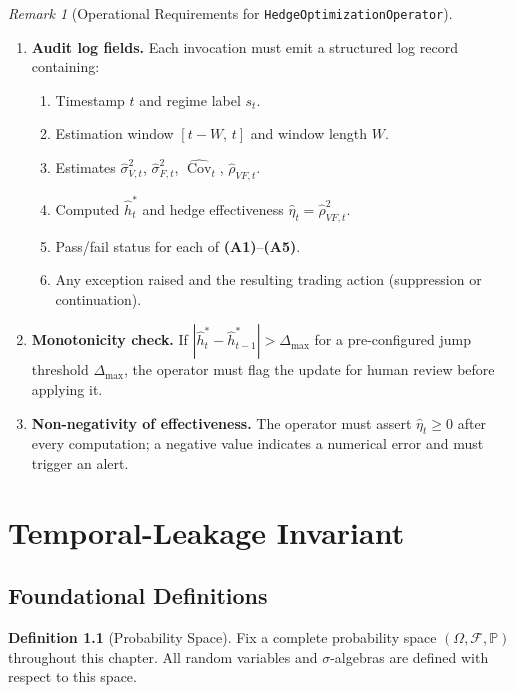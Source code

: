 \documentclass[12pt,openany]{book}
\numberwithin{equation}{chapter}
\theoremstyle{plain}
\theoremstyle{definition}
\newtheorem{definition}[theorem]{Definition}
\theoremstyle{remark}
\newtheorem{remark}[theorem]{Remark}
\numberwithin{equation}{chapter}
\theoremstyle{plain}
\DeclareMathOperator{\Cov}{Cov}
\begin{document}
\begin{remark}[Operational Requirements for \texttt{HedgeOptimizationOperator}]
\begin{enumerate}
  \item \textbf{Audit log fields.}
        Each invocation must emit a structured log record containing:
        \begin{enumerate}
          \item Timestamp $t$ and regime label $s_t$.
          \item Estimation window $[t-W,\,t]$ and window length $W$.
          \item Estimates $\hat\sigma_{V,t}^2$, $\hat\sigma_{F,t}^2$,
                $\widehat{\Cov}_t$, $\hat\rho_{VF,t}$.
          \item Computed $\hat{h}^*_t$ and hedge effectiveness
                $\hat\eta_t = \hat\rho_{VF,t}^2$.
          \item Pass/fail status for each of
                \textbf{(A1)}--\textbf{(A5)}.
          \item Any exception raised and the resulting trading action
                (suppression or continuation).
        \end{enumerate}

  \item \textbf{Monotonicity check.}
        If $|\hat{h}^*_t - \hat{h}^*_{t-1}| > \Delta_{\max}$ for a
        pre-configured jump threshold $\Delta_{\max}$, the operator
        must flag the update for human review before applying it.

  \item \textbf{Non-negativity of effectiveness.}
        The operator must assert $\hat\eta_t \geq 0$ after every
        computation; a negative value indicates a numerical error and
        must trigger an alert.
\end{enumerate}
\end{remark}

\chapter{Temporal-Leakage Invariant}
\label{ch:leakage}

\section{Foundational Definitions}

\begin{definition}[Probability Space]
\label{def:prob-space}
Fix a complete probability space $(\Omega, \mathcal{F}, \mathbb{P})$
throughout this chapter. All random variables and $\sigma$-algebras
are defined with respect to this space.
\end{definition}
\end{document}
